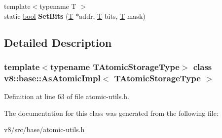 \begin{DoxyCompactItemize}
\item 
\mbox{\label{classv8_1_1base_1_1AsAtomicImpl_a248ac45a7ef7747e70d841a05ff0c83b}} 
{\footnotesize template$<$typename T $>$ }\\static \mbox{\hyperlink{classbool}{bool}} {\bfseries Set\+Bits} (\mbox{\hyperlink{classv8_1_1internal_1_1torque_1_1T}{T}} $\ast$addr, \mbox{\hyperlink{classv8_1_1internal_1_1torque_1_1T}{T}} bits, \mbox{\hyperlink{classv8_1_1internal_1_1torque_1_1T}{T}} mask)
\end{DoxyCompactItemize}


\subsection{Detailed Description}
\subsubsection*{template$<$typename T\+Atomic\+Storage\+Type$>$\newline
class v8\+::base\+::\+As\+Atomic\+Impl$<$ T\+Atomic\+Storage\+Type $>$}



Definition at line 63 of file atomic-\/utils.\+h.



The documentation for this class was generated from the following file\+:\begin{DoxyCompactItemize}
\item 
v8/src/base/atomic-\/utils.\+h\end{DoxyCompactItemize}
